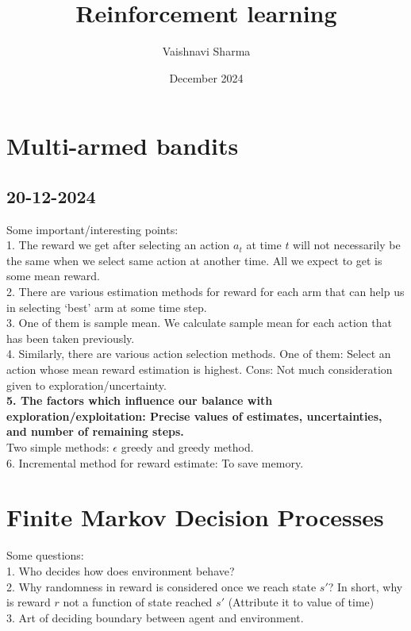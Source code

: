 \documentclass{article}
\title{Reinforcement learning}
\author{Vaishnavi Sharma}
\date{December 2024}
\begin{document}
\maketitle

\section{Multi-armed bandits}
\subsection{20-12-2024}
Some important/interesting points:\\
1. The reward we get after selecting an action $a_{t}$ at time $t$ will not necessarily be the same when we select same action at another time. All we expect to get is some mean reward. \\
2. There are various estimation methods for reward for each arm that can help us in selecting `best' arm at some time step.\\
3. One of them is sample mean. We calculate sample mean for each action that has been taken previously.\\
4. Similarly, there are various action selection methods. One of them: Select an action whose mean reward estimation is highest. Cons: Not much consideration given to exploration/uncertainty.\\
\textbf{5. The factors which influence our balance with exploration/exploitation: Precise values of estimates, uncertainties, and number of remaining steps.}\\

Two simple methods: $\epsilon$ greedy and greedy method.\\
6. Incremental method for reward estimate: To save memory.

\section{Finite Markov Decision Processes}
Some questions:\\
1. Who decides how does environment behave?\\
2. Why randomness in reward is considered once we reach state $s'$? In short, why is reward $r$ not a function of state reached $s'$ (Attribute it to value of time)\\
3. Art of deciding boundary between agent and environment.
\end{document}
